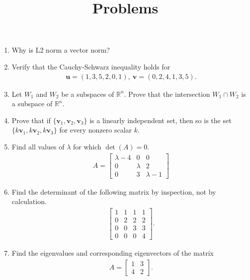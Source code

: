 \documentclass{article}
\title{Problems}
\begin{document}
\maketitle
\begin{enumerate}

\item Why is L2 norm a vector norm?


\item Verify that the Cauchy-Schwarz inequality holds for 
	\begin{align*}
	\mathbf{u}=(1,3,5,2,0,1),~\mathbf{v}=(0,2,4,1,3,5).	
	\end{align*}



\item Let $W_1$ and $W_2$ be a subspaces of $\mathbb{R}^n$. Prove that the intersection $W_1\cap W_2$ is a subspace of $\mathbb{R}^n$.


\item Prove that if $\{\mathbf{v}_1,\mathbf{v}_2,\mathbf{v}_3\}$ is a linearly independent set, then so is the set $\{k\mathbf{v}_1,k\mathbf{v}_2,k\mathbf{v}_3\}$ for every nonzero scalar $k$.

\item
Find all values of $\lambda$ for which $\det(A)=0$.
	\begin{align*}
	A=\left[\begin{array}{lll} \lambda-4&0&0 \\ 0&\lambda&2 \\ 0&3&\lambda-1 \end{array}\right]	
	\end{align*}
	
\item Find the determinant of the following matrix by inspection, not by calculation.
	\begin{align*}
	\left[ \begin{array}{llll} 1&1&1&1 \\ 0&2&2&2 \\ 0&0&3&3 \\ 0&0&0&4 \end{array}\right].	
	\end{align*}



\item Find the eigenvalues and corresponding eigenvectors of the matrix
	\begin{align*}
	A=\left[ \begin{array}{ll} 1&3\\ 4&2 \end{array}\right].	
	\end{align*}


\end{enumerate}
\end{document}
